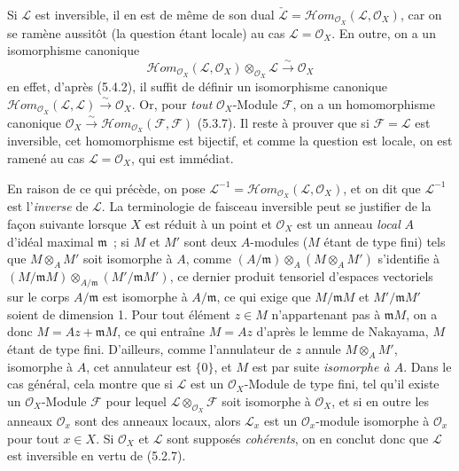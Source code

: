 \begin{env}[5.4.3]
\label{0.5.4.3-fr}
Si $\mathcal{L}$ est inversible, il en est de même de son dual
$\check{\mathcal{L}}=
\mathcal{H}\!om_{\mathcal{O}_X}(\mathcal{L},\mathcal{O}_X)$, car on se ramène
aussitôt (la question étant locale) au cas $\mathcal{L}=\mathcal{O}_X$. En
outre, on a un isomorphisme canonique
\[
  \mathcal{H}\!om_{\mathcal{O}_X}(\mathcal{L},\mathcal{O}_X)
  \otimes_{\mathcal{O}_X}\mathcal{L}
  \xrightarrow{\sim}
  \mathcal{O}_X
  \tag{5.4.3.1}\label{0.5.4.3.1-fr}
\]
en effet, d'après (5.4.2), il suffit de définir un isomorphisme canonique
$\mathcal{H}\!om_{\mathcal{O}_X}(\mathcal{L},\mathcal{L})
\xrightarrow{\sim}\mathcal{O}_X$. Or, pour \emph{tout}
$\mathcal{O}_X$-Module $\mathcal{F}$, on a un homomorphisme canonique
$\mathcal{O}_X\xrightarrow{\sim}
\mathcal{H}\!om_{\mathcal{O}_X}(\mathcal{F},\mathcal{F})$ (5.3.7). Il reste
à prouver que si $\mathcal{F}=\mathcal{L}$ est inversible, cet homomorphisme
est bijectif, et comme la question est locale, on est ramené au cas
$\mathcal{L}=\mathcal{O}_X$, qui est immédiat.

En raison de ce qui précède, on pose
$\mathcal{L}^{-1}=
\mathcal{H}\!om_{\mathcal{O}_X}(\mathcal{L},\mathcal{O}_X)$, et on dit que
$\mathcal{L}^{-1}$ est l'\emph{inverse} de $\mathcal{L}$. La terminologie de
\og faisceau inversible\fg{} peut se justifier de la façon suivante lorsque $X$ est
réduit à un point et $\mathcal{O}_X$ est un anneau \emph{local} $A$ d'idéal
maximal $\mathfrak m$~; si $M$ et $M'$ sont deux $A$-modules ($M$ étant de
type fini) tels que $M\otimes_A M'$ soit isomorphe à $A$, comme
$(A/\mathfrak m)\otimes_A(M\otimes_A M')$ s'identifie à
$(M/\mathfrak mM)\otimes_{A/\mathfrak m}(M'/\mathfrak mM')$, ce dernier
produit tensoriel d'espaces vectoriels sur le corps $A/\mathfrak m$ est
isomorphe à $A/\mathfrak m$, ce qui exige que $M/\mathfrak mM$ et
$M'/\mathfrak mM'$ soient de dimension 1. Pour tout élément $z\in M$
n'appartenant pas à $\mathfrak mM$, on a donc $M=Az+\mathfrak mM$, ce qui
entraîne $M=Az$ d'après le lemme de Nakayama, $M$ étant de type fini.
D'ailleurs, comme l'annulateur de $z$ annule $M\otimes_A M'$, isomorphe à
$A$, cet annulateur est $\{0\}$, et $M$ est par suite \emph{isomorphe à $A$}.
Dans le cas général, cela montre que si $\mathcal{L}$ est un
$\mathcal{O}_X$-Module de type fini, tel qu'il existe un
$\mathcal{O}_X$-Module $\mathcal{F}$ pour lequel
$\mathcal{L}\otimes_{\mathcal{O}_X}\mathcal{F}$ soit isomorphe à
$\mathcal{O}_X$, et si en outre les anneaux $\mathcal{O}_x$ sont des anneaux
locaux, alors $\mathcal{L}_x$ est un $\mathcal{O}_x$-module isomorphe à
$\mathcal{O}_x$ pour tout $x\in X$. Si $\mathcal{O}_X$ et $\mathcal{L}$ sont
supposés \emph{cohérents}, on en conclut donc que $\mathcal{L}$ est inversible
en vertu de (5.2.7).
\end{env}

